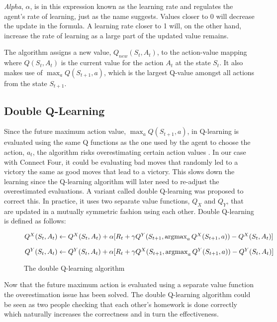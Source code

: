 \documentclass[titlepage]{article}
\begin{document}
\vskip 0.3cm

\noindent
\emph{Alpha}, $\alpha$, is in this expression known as the learning rate and regulates the agent's rate of learning, just as the name suggests. Values closer to 0 will decrease the update in the formula. A learning rate closer to 1 will, on the other hand, increase the rate of learning as a large part of the updated value remains.

\vskip 0.3cm

\noindent
The algorithm assigns a new value, $Q_{new}(S_{t}, A_{t})$, to the action-value mapping where $Q(S_{t}, A_{t})$ is the current value for the action $A_{t}$ at the state $S_{t}$. It also makes use of $\max_{a}Q(S_{t+1}, a)$, which is the largest Q-value amongst all actions from the state $S_{t+1}$. 

\subsection{Double Q-Learning}

\vskip 0.2cm

Since the future maximum action value, $\max_{a}Q(S_{t+1}, a)$, in Q-learning is evaluated using the same Q functions as the one used by the agent to choose the action, $a_{t}$, the algorithm risks overestimating certain action values \cite{doubleq}. In our case with Connect Four, it could be evaluating bad moves that randomly led to a victory the same as good moves that lead to a victory. This slows down the learning since the Q-learning algorithm will later need to re-adjust the overestimated evaluations. A variant called double Q-learning \cite{doubleq} was proposed to correct this. In practice, it uses two separate value functions, $Q_{X}$ and $Q_{Y}$, that are updated in a mutually symmetric fashion using each other. Double Q-learning is defined as follows:

\vskip 0.5cm

\begin{figure}[h]
    \centerline{$Q^X(S_{t}, A_{t}) \leftarrow Q^X(S_{t}, A_{t}) + \alpha[R_{t} + \gamma Q^Y(S_{t+1}, \operatorname*{argmax}_{a}Q^X(S_{t+1}, a)) - Q^X(S_{t}, A_{t})]$}
    \vskip 0.5cm
    \centerline{$Q^Y(S_{t}, A_{t}) \leftarrow Q^Y(S_{t}, A_{t}) + \alpha[R_{t} + \gamma Q^X(S_{t+1}, \operatorname*{argmax}_{a}Q^Y(S_{t+1}, a)) - Q^Y(S_{t}, A_{t})]$}
    \vskip 0.2cm
    \caption{The double Q-learning algorithm}
\end{figure}

\vskip 0.3cm

\noindent
Now that the future maximum action is evaluated using a separate value function the overestimation issue has been solved. The double Q-learning algorithm could be seen as two people checking that each other's homework is done correctly which naturally increases the correctness and in turn the effectiveness.
\end{document}
